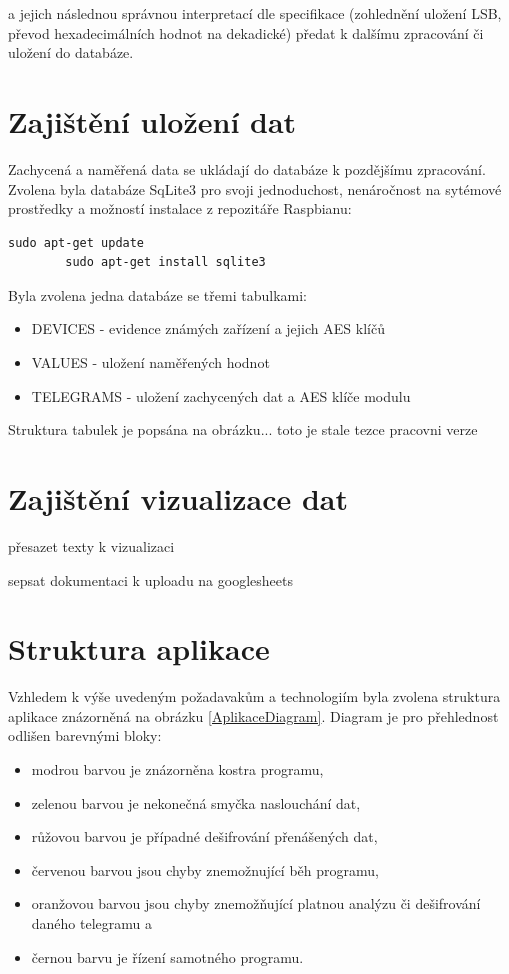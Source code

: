 a jejich následnou správnou interpretací dle specifikace (zohlednění uložení LSB, převod hexadecimálních hodnot na dekadické) předat k dalšímu zpracování či uložení do databáze.


\section{Zajištění uložení dat}
Zachycená a naměřená data se ukládají do databáze k pozdějšímu zpracování. Zvolena byla databáze SqLite3 pro svoji jednoduchost, nenáročnost na sytémové prostředky a možností instalace z repozitáře Raspbianu:
 
\begin{lstlisting}[style=MyCodeBash]
		sudo apt-get update
		sudo apt-get install sqlite3
	\end{lstlisting}

Byla zvolena jedna databáze se třemi tabulkami:
\begin{itemize}
	\item DEVICES - evidence známých zařízení a jejich AES klíčů
	\item VALUES - uložení naměřených hodnot
	\item TELEGRAMS - uložení zachycených dat a AES klíče modulu
\end{itemize}

Struktura tabulek je popsána na obrázku... \colorbox[rgb]{0,1,0}{toto je stale tezce pracovni verze}
	
\section{Zajištění vizualizace dat}	
\colorbox[rgb]{0,1,0}{přesazet texty k vizualizaci}

\colorbox[rgb]{0,1,0}{sepsat dokumentaci k uploadu na googlesheets}

\section{Struktura aplikace}
Vzhledem k výše uvedeným požadavakům a technologiím byla zvolena struktura aplikace znázorněná na obrázku \ref{AplikaceDiagram}. Diagram je pro přehlednost odlišen barevnými bloky:
\begin{itemize}
	\item modrou barvou je znázorněna kostra programu,
	\item zelenou barvou je nekonečná smyčka naslouchání dat,
	\item růžovou barvou je případné dešifrování přenášených dat,
	\item červenou barvou jsou chyby znemožnující běh programu,
	\item oranžovou barvou jsou chyby znemožňující platnou analýzu či dešifrování daného telegramu a
	\item černou barvu je řízení samotného programu.
\end{itemize}

